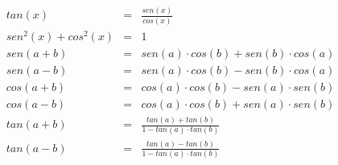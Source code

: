  \begin{eqnarray*}
  tan(x)&=&\frac{sen(x)}{cos(x)} \\
  sen^2(x) + cos^2(x)&=&1 \\
  sen(a+b)&=&sen(a)\cdot cos(b)+sen(b)\cdot cos(a) \\
  sen(a-b)&=&sen(a)\cdot cos(b)-sen(b)\cdot cos(a) \\
  cos(a+b)&=&cos(a)\cdot cos(b)-sen(a)\cdot sen(b) \\
  cos(a-b)&=&cos(a)\cdot cos(b)+sen(a)\cdot sen(b) \\
  tan(a+b)&=& \frac{tan(a)+tan(b)}{1-tan(a)\cdot tan(b)} \\
  tan(a-b)&=& \frac{tan(a)-tan(b)}{1-tan(a)\cdot tan(b)}
 \end{eqnarray*}
